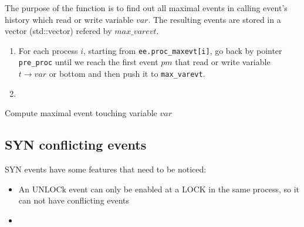 \documentclass{llncs}
\begin{document}
\begin{algorithm}
The purpose of the function is to find out all maximal events in calling event's history which read or write variable $var$. The resulting events are stored in a vector (std::vector) refered by $max\_varevt$.  
\begin{enumerate}
\item
	For each process $i$, starting from \verb!ee.proc_maxevt[i]!, go back by pointer \verb!pre_proc! until we reach the first event $pm$ that read or write variable $t \rightarrow var$ or bottom and then push it to \verb!max_varevt!.
\item
	
\end{enumerate}

\label{a:pre_max}
\caption{Compute maximal event touching variable $var$ }
\end{algorithm}

\subsection{SYN conflicting events}
SYN events have some features that need to be noticed:
\begin{itemize}
\item
	An UNLOCk event can only be enabled at a LOCK in the same process, so it can not have conflicting events
\item
	
	
\end{itemize}
\end{document}
